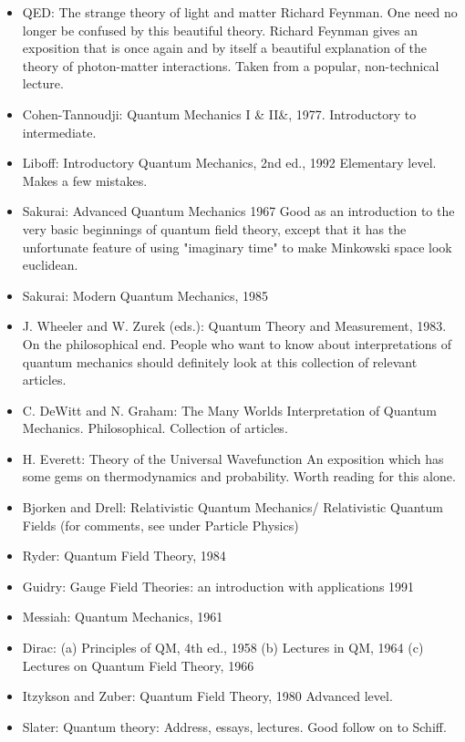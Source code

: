 \documentclass[10pt,a4paper]{book}
\theoremstyle{definition}
\begin{document}
\begin{itemize}
\item QED: The strange theory of light and matter Richard Feynman.
One need no longer be confused by this beautiful theory.  Richard Feynman gives an exposition that is once again and by itself a beautiful explanation of the theory of photon-matter interactions.  Taken from a popular, non-technical lecture.

\item Cohen-Tannoudji: Quantum Mechanics I \& II\&, 1977.
Introductory to intermediate.

\item Liboff: Introductory Quantum Mechanics, 2nd ed., 1992
Elementary level.  Makes a few mistakes.

\item Sakurai: Advanced Quantum Mechanics 1967
Good as an introduction to the very basic beginnings of quantum field theory, except that it has the unfortunate feature of using "imaginary time" to make Minkowski space look euclidean.
\item Sakurai: Modern Quantum Mechanics, 1985
\item J. Wheeler and W. Zurek (eds.): Quantum Theory and Measurement, 1983. On the philosophical end.  People who want to know about interpretations of quantum mechanics should definitely look at this collection of relevant articles.
\item C. DeWitt and N. Graham: The Many Worlds Interpretation of Quantum Mechanics. Philosophical.  Collection of articles.
\item H. Everett: Theory of the Universal Wavefunction
An exposition which has some gems on thermodynamics and probability.  Worth reading for this alone.
\item Bjorken and Drell: Relativistic Quantum Mechanics/ Relativistic Quantum Fields
(for comments, see under Particle Physics)
\item Ryder: Quantum Field Theory, 1984
\item Guidry: Gauge Field Theories: an introduction with applications 1991
\item Messiah: Quantum Mechanics, 1961
\item Dirac:
(a) Principles of QM, 4th ed., 1958
(b) Lectures in QM, 1964
(c) Lectures on Quantum Field Theory, 1966
\item Itzykson and Zuber: Quantum Field Theory, 1980
Advanced level.
\item Slater: Quantum theory: Address, essays, lectures.
Good follow on to Schiff.


\end{itemize}
\end{document}
